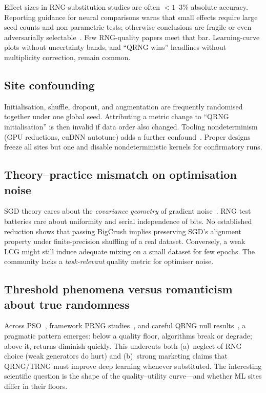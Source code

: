 Effect sizes in RNG-substitution studies are often $<1$--$3\%$ absolute accuracy.
Reporting guidance for neural comparisons warns that small effects require large seed counts and non-parametric tests; otherwise conclusions are fragile or even adversarially selectable~\cite{akesson2024reporting}.
Few RNG-quality papers meet that bar.
Learning-curve plots without uncertainty bands, and ``QRNG wins'' headlines without multiplicity correction, remain common.

\subsection{Site confounding}

Initialisation, shuffle, dropout, and augmentation are frequently randomised together under one global seed.
Attributing a metric change to ``QRNG initialisation'' is then invalid if data order also changed.
Tooling nondeterminism (GPU reductions, cuDNN autotune) adds a further confound~\cite{zhuang2022randomness}.
Proper designs freeze all sites but one and disable nondeterministic kernels for confirmatory runs.

\subsection{Theory--practice mismatch on optimisation noise}

SGD theory cares about the \emph{covariance geometry} of gradient noise~\cite{zhu2019anisotropic,wu2022alignment}.
RNG test batteries care about uniformity and serial independence of bits.
No established reduction shows that passing BigCrush implies preserving SGD's alignment property under finite-precision shuffling of a real dataset.
Conversely, a weak LCG might still induce adequate mixing on a small dataset for few epochs.
The community lacks a \emph{task-relevant} quality metric for optimiser noise.

\subsection{Threshold phenomena versus romanticism about true randomness}

Across PSO~\cite{bastos2009pso}, framework PRNG studies~\cite{antunes2025influence}, and careful QRNG null results~\cite{heese2024biased}, a pragmatic pattern emerges: below a quality floor, algorithms break or degrade; above it, returns diminish quickly.
This undercuts both (a)~neglect of RNG choice (weak generators do hurt) and (b)~strong marketing claims that QRNG/TRNG must improve deep learning whenever substituted.
The interesting scientific question is the shape of the quality--utility curve---and whether ML sites differ in their floors.

